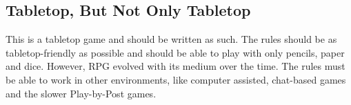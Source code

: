 \begin{multicols}{2}
\subsection{Tabletop, But Not Only Tabletop}\label{subsec:tabletop}
This is a tabletop game and should be written as such. The rules should be as tabletop-friendly as possible and should be able to play with only pencils, paper and dice. However, RPG evolved with its medium over the time. The rules must be able to work in other environments, like computer assisted, chat-based games and the slower Play-by-Post games.

\end{multicols}